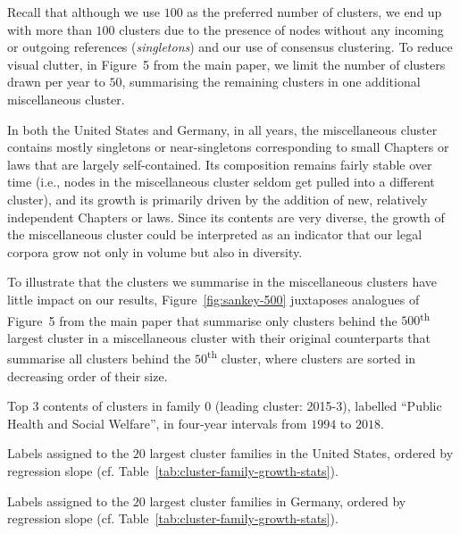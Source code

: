 Recall that although we use $100$ as the preferred number of clusters, we end up with more than $100$ clusters due to the presence of nodes without any incoming or outgoing references (\emph{singletons}) and our use of consensus clustering. 
To reduce visual clutter, in Figure~5 from the main paper, we limit the number of clusters drawn per year to $50$, 
summarising the remaining clusters in one additional miscellaneous cluster. 

In both the United States and Germany, in all years,
the miscellaneous cluster contains mostly singletons or near-singletons corresponding to small Chapters or laws that are largely self-contained. 
Its composition remains fairly stable over time (i.e., nodes in the miscellaneous cluster seldom get pulled into a different cluster), 
and its growth is primarily driven by the addition of new, relatively independent Chapters or laws.
Since its contents are very diverse, 
the growth of the miscellaneous cluster could be interpreted as an indicator that our legal corpora grow not only in volume but also in diversity.

To illustrate that the clusters we summarise in the miscellaneous clusters have little impact on our results, 
Figure~\ref{fig:sankey-500} juxtaposes analogues of Figure~5 from the main paper 
that summarise only clusters behind the $500$\textsuperscript{th} largest cluster in a miscellaneous cluster with their original counterparts that summarise all clusters behind the $50$\textsuperscript{th} cluster, where clusters are sorted in decreasing order of their size. 


\begin{table}[H]
	\centering\footnotesize
	
	\caption{Top $3$ contents of clusters in family $0$ (leading cluster: 2015-3), labelled ``Public Health and Social Welfare'', in four-year intervals from $1994$ to $2018$.
}
	\label{tab:cluster-labeling}
\end{table}



\begin{table}[H]
	\centering
	
	\caption{Labels assigned to the $20$ largest cluster families in the United States, ordered by regression slope (cf. Table~\ref{tab:cluster-family-growth-stats}).
	}
	\label{tab:labels-all-us}
\end{table}

\begin{table}[H]
	\centering
	
	\caption{Labels assigned to the $20$ largest cluster families in Germany, ordered by regression slope (cf. Table~\ref{tab:cluster-family-growth-stats}).
	}
	\label{tab:labels-all-de}
\end{table}

